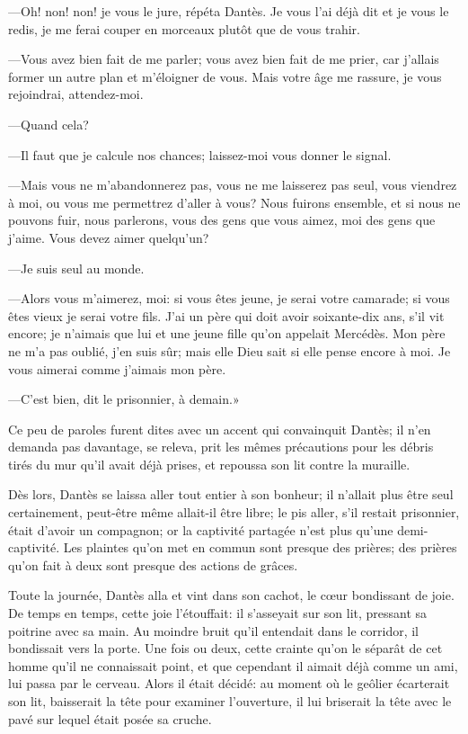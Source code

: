—Oh! non! non! je vous le jure, répéta Dantès. Je vous l'ai déjà dit et je vous le redis, je me ferai couper en morceaux plutôt que de vous trahir.

—Vous avez bien fait de me parler; vous avez bien fait de me prier, car j'allais former un autre plan et m'éloigner de vous. Mais votre âge me rassure, je vous rejoindrai, attendez-moi.

—Quand cela?

—Il faut que je calcule nos chances; laissez-moi vous donner le signal.

—Mais vous ne m'abandonnerez pas, vous ne me laisserez pas seul, vous viendrez à moi, ou vous me permettrez d'aller à vous? Nous fuirons ensemble, et si nous ne pouvons fuir, nous parlerons, vous des gens que vous aimez, moi des gens que j'aime. Vous devez aimer quelqu'un?

—Je suis seul au monde.

—Alors vous m'aimerez, moi: si vous êtes jeune, je serai votre camarade; si vous êtes vieux je serai votre fils. J'ai un père qui doit avoir soixante-dix ans, s'il vit encore; je n'aimais que lui et une jeune fille qu'on appelait Mercédès. Mon père ne m'a pas oublié, j'en suis sûr; mais elle Dieu sait si elle pense encore à moi. Je vous aimerai comme j'aimais mon père.

—C'est bien, dit le prisonnier, à demain.»

Ce peu de paroles furent dites avec un accent qui convainquit Dantès; il n'en demanda pas davantage, se releva, prit les mêmes précautions pour les débris tirés du mur qu'il avait déjà prises, et repoussa son lit contre la muraille.

Dès lors, Dantès se laissa aller tout entier à son bonheur; il n'allait plus être seul certainement, peut-être même allait-il être libre; le pis aller, s'il restait prisonnier, était d'avoir un compagnon; or la captivité partagée n'est plus qu'une demi-captivité. Les plaintes qu'on met en commun sont presque des prières; des prières qu'on fait à deux sont presque des actions de grâces.

Toute la journée, Dantès alla et vint dans son cachot, le cœur bondissant de joie. De temps en temps, cette joie l'étouffait: il s'asseyait sur son lit, pressant sa poitrine avec sa main. Au moindre bruit qu'il entendait dans le corridor, il bondissait vers la porte. Une fois ou deux, cette crainte qu'on le séparât de cet homme qu'il ne connaissait point, et que cependant il aimait déjà comme un ami, lui passa par le cerveau. Alors il était décidé: au moment où le geôlier écarterait son lit, baisserait la tête pour examiner l'ouverture, il lui briserait la tête avec le pavé sur lequel était posée sa cruche.

